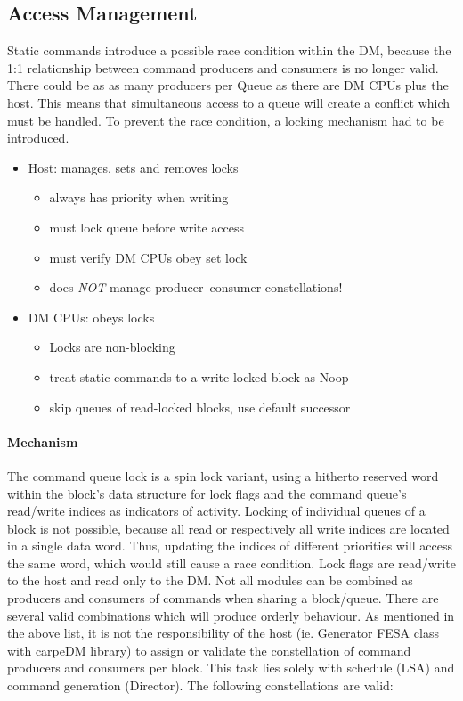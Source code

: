 \subsection{Access Management}
\label{ssec:locks}
Static commands introduce a possible race condition within the DM, because the 1:1 relationship between command producers and consumers is no longer valid. There could be as as many producers per Queue as there are DM CPUs plus the host. This means that simultaneous access to a queue will create a conflict which must be handled. To prevent the race condition, a locking mechanism had to be introduced.
\begin{itemize}
  \item{Host: manages, sets and removes locks}
  \begin{itemize}
    \item{always has priority when writing}
    \item{must lock queue before write access}
    \item{must verify DM CPUs obey set lock}
    \item{does \emph{NOT} manage producer--consumer constellations!}
  \end{itemize}
  \item{DM CPUs: obeys locks}
  \begin{itemize}
   \item{Locks are non-blocking}
   \item{treat static commands to a write-locked block as Noop}
   \item{skip queues of read-locked blocks, use default successor}
  \end{itemize}
\end{itemize}







\paragraph{Mechanism}
The command queue lock is a spin lock variant, using a hitherto reserved word within the block's data structure for lock flags and the command queue's read/write indices as indicators of activity.
Locking of individual queues of a block is not possible, because all read or respectively all write indices are located in a single data word. Thus, updating the indices of different priorities will access the same word, which would still cause a race condition. Lock flags are read/write to the host and read only to the DM.
Not all modules can be combined as producers and consumers of commands when sharing a block/queue. There are several valid combinations which will produce orderly behaviour.
As mentioned in the above list, it is not the responsibility of the host (ie. Generator FESA class with carpeDM library)
to assign or validate the constellation of command producers and consumers per block. This task lies solely with schedule (LSA) and command generation (Director). The following constellations are valid:


